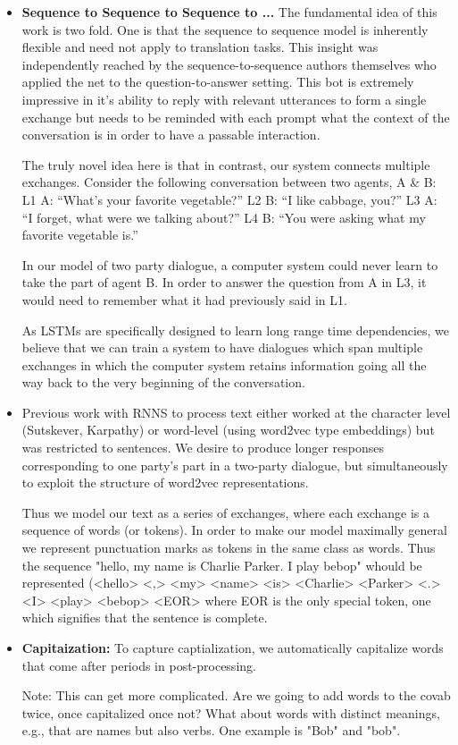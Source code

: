 \documentclass[]{article}
\begin{document}
\begin{itemize}


\item \textbf{ Sequence to Sequence to Sequence to ...} The fundamental idea of this work is two fold. One is that the sequence to sequence model is inherently flexible and need not apply to translation tasks. This insight was independently reached by the sequence-to-sequence authors themselves who applied the net to the question-to-answer setting. This bot is extremely impressive in it's ability to reply with relevant utterances to form a single exchange but needs to be reminded with each prompt what the context of the conversation is in order to have a passable interaction.

The truly novel idea here is that in contrast, our system connects multiple exchanges.
Consider the following conversation between two agents, A & B:
L1  A:  “What’s your favorite vegetable?”
L2  B:  “I like cabbage, you?”
L3  A:  “I forget, what were we talking about?”
L4  B:  “You were asking what my favorite vegetable is.”

In our model of two party dialogue, a computer system could never learn to take the part of agent B. In order to answer the question from A in L3, it would need to remember what it had previously said in L1.

As LSTMs are specifically designed to learn long range time dependencies, we believe that we can train a system to have dialogues which span multiple exchanges in which the computer system retains information going all the way back to the very beginning of the conversation.

\item Previous work with RNNS to process text either worked at the character level (Sutskever, Karpathy) or word-level (using word2vec type embeddings) but was restricted to sentences. We desire to produce longer responses corresponding to one party's part in a two-party dialogue, but simultaneously to exploit the structure of word2vec representations.

Thus we model our text as a series of exchanges, where each exchange is a sequence of words (or tokens). In order to make our model maximally general we represent punctuation marks as tokens in the same class as words. Thus the sequence "hello, my name is Charlie Parker. I play bebop" whould be represented (<hello> <,> <my> <name> <is> <Charlie> <Parker> <.> <I> <play> <bebop> <EOR> where EOR is the only special token, one which signifies that the sentence is complete.

\item \textbf{Capitaization:} To capture captialization, we automatically capitalize words that come after periods in post-processing.

Note: This can get more complicated. Are we going to add words to the covab twice, once capitalized once not? What about words with distinct meanings, e.g., that are names but also verbs. One example is "Bob" and "bob".

\end{itemize}


\end{document}
